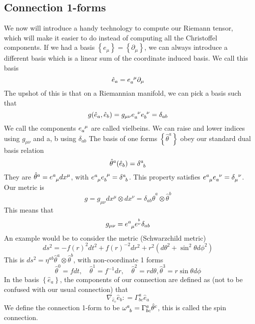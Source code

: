 \subsection{Connection 1-forms} 
We now will introduce a handy technology to compute 
our Riemann tensor, which will make it easier to do instead of 
computing all the Christoffel components. 
If we had a basis $ \left\{  e _ \mu  \right\}  = \left\{  \partial  _ \mu  \right\}  $, 
we can always introduce a different basis which is a linear 
sum of the coordinate induced basis. We call this 
basis 
\[
 \hat{e}_a = e \indices{ _ a ^ \mu } \partial  _ \mu  
\] The upshot of this is that on a
Riemannian manifold, we can pick a basis such that 
\[
	g ( \hat{e }_a , \hat{e}_b ) = g_{ \mu \nu } e \indices{ _ a ^ \nu } e \indices{ _ b ^ \nu } = \delta _{ ab }  
\] We call the components 
$ e \indices{ _ a ^ \mu }  $ are called vielbeins. 
We can raise and lower indices using $ g_{ \mu \nu } $ and a, b using $ \delta _{ a b } $
The basis of one forms $ \left\{  \hat{\theta } ^ a   \right\} $ obey 
our standard dual basis relation 
\[
	\hat{\theta } ^ a ( \hat{e } _ b ) = \delta \indices{ ^ a _ b }  
\]  They are $ \hat{ \theta } ^ a = e \indices{ ^ a _ \mu } dx ^ \mu  $, 
with $ e \indices{ ^ a _ \mu } e \indices{ _ b ^ \mu }  = \delta \indices{ ^ a _ b }  $. 
This property satisfies $ e \indices{ ^ a _ \mu } e \indices{ _ a ^ \nu } = \delta \indices{ _ \mu ^ \nu } $. 
Our metric is 
\[
 g = g_{ \mu \nu } dx ^ \mu \otimes dx ^ \nu = \delta _{ ab } \hat{\theta } ^ a \otimes \hat{ \theta } ^ b 
\] This means that 
\[
 g_{ \mu \nu } = e \indices{ ^ a _ \mu } e ^{ ^ b _ \nu } \delta _{ ab }  
\] An example would be to consider the metric 
(Schwarzchild metric) 
\[
	d s ^ 2 = - f ( r ) ^ 2 dt ^ 2 + f ( r) ^{ - 2} dr ^ 2 
	+ r ^ 2 ( d \theta ^ 2 + \sin ^2 \theta d \phi ^ 2 ) 
\] This is $ ds ^ 2   = \eta ^{ ab  } \hat{ \theta } ^ a \otimes \hat{ \theta } ^ b $, 
with non-coordinate 1 forms 
\[
 \hat{ \theta } ^ 0 = f dt , \quad \hat{ \theta  } ^ 1 = f ^{ -  1 } dr, \quad \hat{ \theta } ^ 2 = r d \theta , 
 \hat{ \theta  } ^ 3 = r \sin \theta d \phi 
\] In the basis $ \left\{  \hat{ e } _ a  \right\}  $, the components 
of our connection are defined as (not to be confused with our usual 
connection) that 
\[
 \nabla _{ \hat{ e } _ c } \hat{ e } _ b : = \Gamma ^ a _{ b c } \hat{ e } _a 
\] We define the connection 
1-form to be $ \omega  \indices{ ^ a _ b } = \Gamma ^ a _{ bc } \hat{ \theta } ^ c  $, 
this is called the spin connection. 

